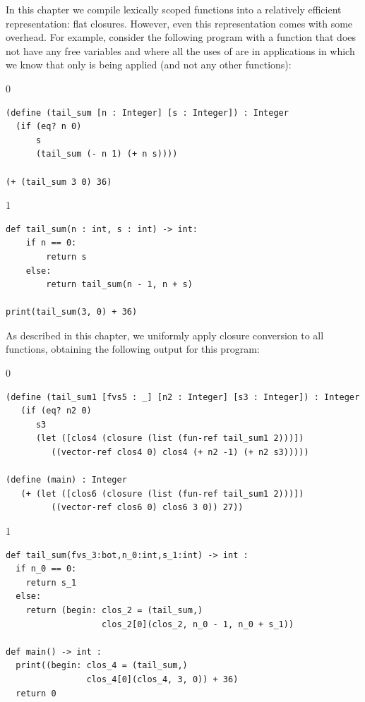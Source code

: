 \documentclass[7x10]{TimesAPriori_MIT}%
\def\racketEd{0}
\def\pythonEd{1}
\providecommand{\BookEdition}{1}
\let\edition\BookEdition
\newcommand{\pythonColor}[0]{}
\numberwithin{theorem}{chapter}
\numberwithin{definition}{chapter}
\numberwithin{equation}{chapter}
\begin{document}
In this chapter we compile lexically scoped functions into a
relatively efficient representation: flat closures. However, even this
representation comes with some overhead. For example, consider the
following program with a function  that does not have
any free variables and where all the uses of  are in
applications in which we know that only  is being applied
(and not any other functions):
\begin{center}
\begin{minipage}{0.95\textwidth}
{\if\edition\racketEd  
\begin{lstlisting}
(define (tail_sum [n : Integer] [s : Integer]) : Integer
  (if (eq? n 0)
      s
      (tail_sum (- n 1) (+ n s))))

(+ (tail_sum 3 0) 36)
\end{lstlisting}
\fi}
{\if\edition\pythonEd\pythonColor
\begin{lstlisting}
def tail_sum(n : int, s : int) -> int:
    if n == 0:
        return s
    else:
        return tail_sum(n - 1, n + s)

print(tail_sum(3, 0) + 36)
\end{lstlisting}
\fi}
\end{minipage}
\end{center}
As described in this chapter, we uniformly apply closure conversion to
all functions, obtaining the following output for this program:
\begin{center}
\begin{minipage}{0.95\textwidth}
{\if\edition\racketEd  
\begin{lstlisting}
(define (tail_sum1 [fvs5 : _] [n2 : Integer] [s3 : Integer]) : Integer
   (if (eq? n2 0)
      s3
      (let ([clos4 (closure (list (fun-ref tail_sum1 2)))])
         ((vector-ref clos4 0) clos4 (+ n2 -1) (+ n2 s3)))))

(define (main) : Integer
   (+ (let ([clos6 (closure (list (fun-ref tail_sum1 2)))])
         ((vector-ref clos6 0) clos6 3 0)) 27))
\end{lstlisting}
\fi}
{\if\edition\pythonEd\pythonColor
\begin{lstlisting}
def tail_sum(fvs_3:bot,n_0:int,s_1:int) -> int :
  if n_0 == 0:
    return s_1
  else:
    return (begin: clos_2 = (tail_sum,)
                   clos_2[0](clos_2, n_0 - 1, n_0 + s_1))

def main() -> int :
  print((begin: clos_4 = (tail_sum,)
                clos_4[0](clos_4, 3, 0)) + 36)
  return 0
\end{lstlisting}
\fi}
\end{minipage}
\end{center}
\end{document}
